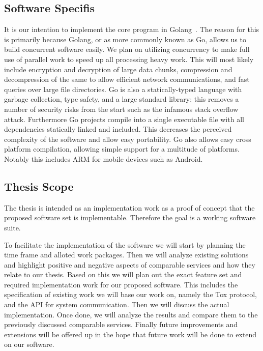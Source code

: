 \documentclass[a4paper,10pt,twoside]{article}
\begin{document}
\subsection{Software Specifis}

It is our intention to implement the core program in Golang~\cite{web:site:golang}.
The reason for this is primarily because Golang, or as more commonly known as Go, allows us to build concurrent software easily.
We plan on utilizing concurrency to make full use of parallel work to speed up all processing heavy work.
This will most likely include encryption and decryption of large data chunks, compression and decompression of the same to allow efficient network communications, and fast queries over large file directories.
Go is also a statically-typed language with garbage collection, type safety, and a large standard library: this removes a number of security risks from the start such as the infamous stack overflow attack.
Furthermore Go projects compile into a single executable file with all dependencies statically linked and included.
This decreases the perceived complexity of the software and allow easy portability.
Go also allows easy cross platform compilation, allowing simple support for a multitude of platforms.
Notably this includes ARM for mobile devices such as Android.


\subsection{Thesis Scope}

The thesis is intended as an implementation work as a proof of concept that the proposed software set is implementable.
Therefore the goal is a working software suite.

To facilitate the implementation of the software we will start by planning the time frame and alloted work packages.
Then we will analyze existing solutions and highlight positive and negative aspects of comparable services and how they relate to our thesis.
Based on this we will plan out the exact feature set and required implementation work for our proposed software.
This includes the specification of existing work we will base our work on, namely the Tox protocol, and the API for system communication.
Then we will discuss the actual implementation.
Once done, we will analyze the results and compare them to the previously discussed comparable services.
Finally future improvements and extensions will be offered up in the hope that future work will be done to extend on our software.
\end{document}

